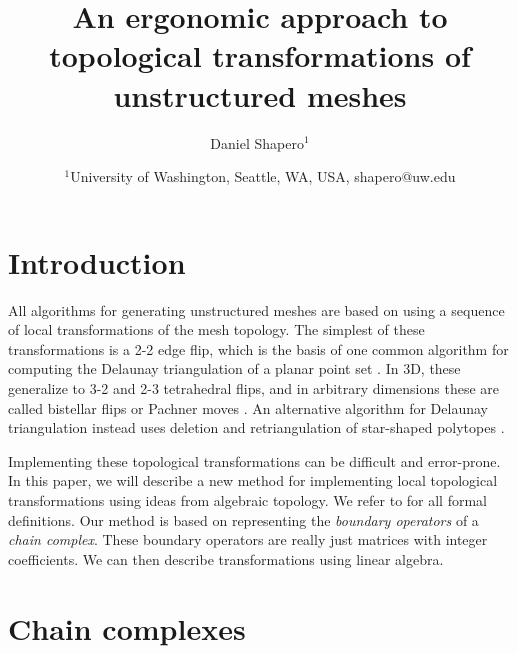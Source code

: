 \documentclass[twocolumn]{article}
\begin{document}
\title{An ergonomic approach to topological transformations of unstructured meshes}
\author{Daniel Shapero$^1$}
\date{
    $^1$University of Washington, Seattle, WA, USA, shapero@uw.edu
}



\maketitle
\thispagestyle{empty}
\pagestyle{empty}


\section{Introduction}

All algorithms for generating unstructured meshes are based on using a sequence of local transformations of the mesh topology.
The simplest of these transformations is a 2-2 edge flip, which is the basis of one common algorithm for computing the Delaunay triangulation of a planar point set \cite{lawson1972transforming}.
In 3D, these generalize to 3-2 and 2-3 tetrahedral flips, and in arbitrary dimensions these are called bistellar flips or Pachner moves \cite{pachner1991pl}.
An alternative algorithm for Delaunay triangulation instead uses deletion and retriangulation of star-shaped polytopes \cite{bowyer1981computing, watson1981computing}.

Implementing these topological transformations can be difficult and error-prone.
In this paper, we will describe a new method for implementing local topological transformations using ideas from algebraic topology.
We refer to \cite{hatcher2002algebraic} for all formal definitions.
Our method is based on representing the \emph{boundary operators} of a \emph{chain complex}.
These boundary operators are really just matrices with integer coefficients.
We can then describe transformations using linear algebra.


\section{Chain complexes}
\end{document}
